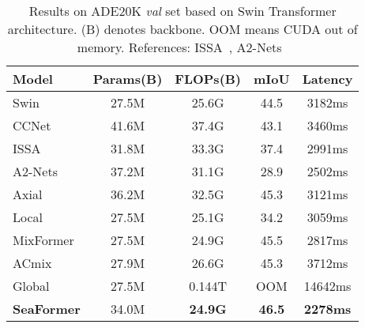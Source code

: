 \begin{table}
    \centering
    \small
 
    \begin{tabular}[b]{l | c |c |c | c}

    \hline
    Model     & Params(B)     & FLOPs(B)        & mIoU  & Latency\\
    \hline

    Swin	&27.5M	&25.6G	&44.5	&3182ms\\
    CCNet	&41.6M	&37.4G	&43.1	&3460ms\\
    ISSA	&31.8M	&33.3G	&37.4	&2991ms\\
    A2-Nets	&37.2M	&31.1G	&28.9	&2502ms\\
    Axial	&36.2M	&32.5G	&45.3	&3121ms\\
    Local	&27.5M	&25.1G	&34.2	&3059ms\\
    MixFormer	&27.5M	&24.9G	&45.5	&2817ms\\
    ACmix	&27.9M	&26.6G	&45.3	&3712ms\\
    Global	&27.5M	&0.144T	&OOM	&14642ms\\

    \hline

    \textbf{SeaFormer}	&34.0M	&\textbf{24.9G}	&\textbf{46.5} &\textbf{2278ms}\\

    \hline
  \end{tabular}
\caption{Results on ADE20K \textit{val} set based on Swin Transformer architecture. (B) denotes backbone. OOM means CUDA out of memory. References: ISSA~\cite{huang2019interlaced}, A2-Nets~\cite{chen20182}}
\label{table_swin} 
\end{table}